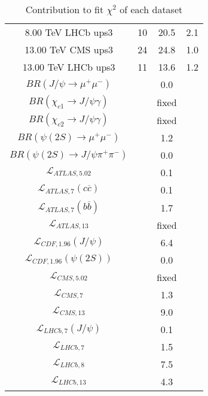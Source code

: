 \begin{table}[h!]
\begin{tabular}{c|c|c|c}
8.00 TeV LHCb ups3 & 10 & 20.5 & 2.1 \\
13.00 TeV CMS ups3 & 24 & 24.8 & 1.0 \\
13.00 TeV LHCb ups3 & 11 & 13.6 & 1.2 \\
\hline
$BR(J/\psi\rightarrow\mu^+\mu^-)$ &  & 0.0 &  \\
$BR(\chi_{c1}\rightarrow J/\psi\gamma)$ &  & fixed & \\
$BR(\chi_{c2}\rightarrow J/\psi\gamma)$ &  & fixed & \\
$BR(\psi(2S)\rightarrow\mu^+\mu^-)$ &  & 1.2 &  \\
$BR(\psi(2S)\rightarrow J/\psi\pi^+\pi^-)$ &  & 0.0 &  \\
$\mathcal L_{ATLAS,5.02}$ &  & 0.1 &  \\
$\mathcal L_{ATLAS,7}(c\overline c)$ &  & 0.1 &  \\
$\mathcal L_{ATLAS,7}(b\overline b)$ &  & 1.7 &  \\
$\mathcal L_{ATLAS,13}$ &  & fixed & \\
$\mathcal L_{CDF,1.96}(J/\psi)$ &  & 6.4 &  \\
$\mathcal L_{CDF,1.96}(\psi(2S))$ &  & 0.0 &  \\
$\mathcal L_{CMS,5.02}$ &  & fixed & \\
$\mathcal L_{CMS,7}$ &  & 1.3 &  \\
$\mathcal L_{CMS,13}$ &  & 9.0 &  \\
$\mathcal L_{LHCb,7}(J/\psi)$ &  & 0.1 &  \\
$\mathcal L_{LHCb,7}$ &  & 1.5 &  \\
$\mathcal L_{LHCb,8}$ &  & 7.5 &  \\
$\mathcal L_{LHCb,13}$ &  & 4.3 &  \\
\end{tabular}
\caption{Contribution to fit $\chi^2$ of each dataset}
\end{table}
